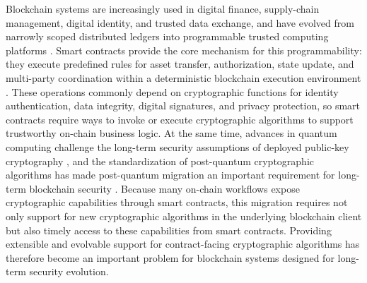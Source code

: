 \documentclass[pdflatex,sn-mathphys-num]{sn-jnl}%
\theoremstyle{thmstyleone}%
\theoremstyle{thmstyletwo}%
\theoremstyle{thmstylethree}%
\begin{document}
Blockchain systems are increasingly used in digital finance, supply-chain management, digital identity, and trusted data exchange, and have evolved from narrowly scoped distributed ledgers into programmable trusted computing platforms \cite{nakamoto2008bitcoin,zou2021smartContracts}. Smart contracts provide the core mechanism for this programmability: they execute predefined rules for asset transfer, authorization, state update, and multi-party coordination within a deterministic blockchain execution environment \cite{woodEthereumYellowPaper,ethereumEVM}. These operations commonly depend on cryptographic functions for identity authentication, data integrity, digital signatures, and privacy protection, so smart contracts require ways to invoke or execute cryptographic algorithms to support trustworthy on-chain business logic. At the same time, advances in quantum computing challenge the long-term security assumptions of deployed public-key cryptography \cite{shor1999,grover1996}, and the standardization of post-quantum cryptographic algorithms has made post-quantum migration an important requirement for long-term blockchain security \cite{nistPqcProject}. Because many on-chain workflows expose cryptographic capabilities through smart contracts, this migration requires not only support for new cryptographic algorithms in the underlying blockchain client but also timely access to these capabilities from smart contracts. Providing extensible and evolvable support for contract-facing cryptographic algorithms has therefore become an important problem for blockchain systems designed for long-term security evolution.
\end{document}
